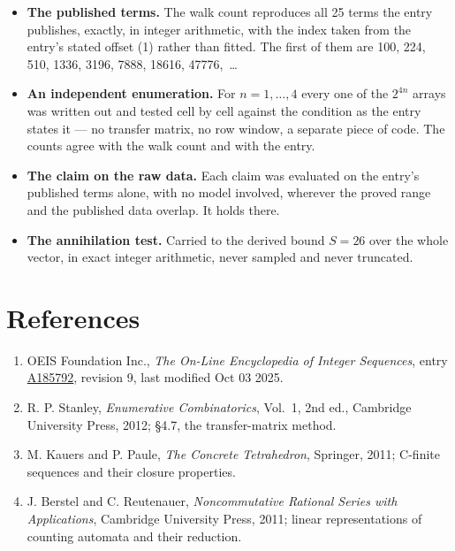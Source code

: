 \documentclass[11pt]{article}
\theoremstyle{definition}
\begin{document}
\begin{itemize}

\item {\bfseries The published terms.} The walk count reproduces all 25 terms the entry publishes, exactly, in integer arithmetic, with the index taken from the entry's stated offset (1) rather than fitted. The first of them are 100, 224, 510, 1336, 3196, 7888, 18616, 47776,~\dots

\item {\bfseries An independent enumeration.} For $n = 1,\dots,4$ every one of the $2^{4n}$ arrays was written out and tested cell by cell against the condition as the entry states it --- no transfer matrix, no row window, a separate piece of code. The counts agree with the walk count and with the entry.

\item {\bfseries The claim on the raw data.} Each claim was evaluated on the entry's published terms alone, with no model involved, wherever the proved range and the published data overlap. It holds there.

\item {\bfseries The annihilation test.} Carried to the derived bound $S = 26$ over the whole vector, in exact integer arithmetic, never sampled and never truncated.

\end{itemize}

\section{References}

\begin{enumerate}

\item OEIS Foundation Inc., \emph{The On-Line Encyclopedia of Integer Sequences}, entry \href{https://oeis.org/A185792}{A185792}, revision 9, last modified Oct 03 2025.

\item R. P. Stanley, \emph{Enumerative Combinatorics}, Vol.~1, 2nd ed., Cambridge University Press, 2012; \S4.7, the transfer-matrix method.

\item M. Kauers and P. Paule, \emph{The Concrete Tetrahedron}, Springer, 2011; C-finite sequences and their closure properties.

\item J. Berstel and C. Reutenauer, \emph{Noncommutative Rational Series with Applications}, Cambridge University Press, 2011; linear representations of counting automata and their reduction.

\end{enumerate}
\end{document}
